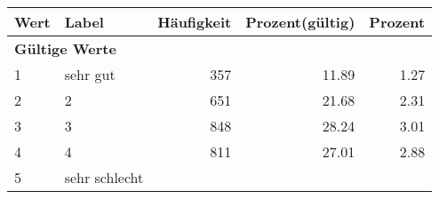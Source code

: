      \begin{longtable}{lXrrr}
     \toprule
     \textbf{Wert} & \textbf{Label} & \textbf{Häufigkeit} & \textbf{Prozent(gültig)} & \textbf{Prozent} \\
     \endhead
     \midrule
     \multicolumn{5}{l}{\textbf{Gültige Werte}}\\

     1 &
     \multicolumn{1}{X}{ sehr gut   } &


       \num{357} &
       \num[round-mode=places,round-precision=2]{11.89} &
         \num[round-mode=places,round-precision=2]{1.27} \\

     2 &
     \multicolumn{1}{X}{ 2   } &


       \num{651} &
       \num[round-mode=places,round-precision=2]{21.68} &
         \num[round-mode=places,round-precision=2]{2.31} \\

     3 &
     \multicolumn{1}{X}{ 3   } &


       \num{848} &
       \num[round-mode=places,round-precision=2]{28.24} &
         \num[round-mode=places,round-precision=2]{3.01} \\

     4 &
     \multicolumn{1}{X}{ 4   } &


       \num{811} &
       \num[round-mode=places,round-precision=2]{27.01} &
         \num[round-mode=places,round-precision=2]{2.88} \\

     5 &
     \multicolumn{1}{X}{ sehr schlecht   } &



\end{longtable}
